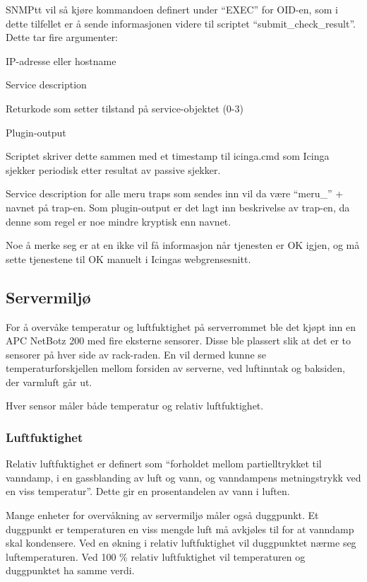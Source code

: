 SNMPtt vil så kjøre kommandoen definert under ``EXEC'' for OID-en, som i dette tilfellet er å sende informasjonen videre til scriptet ``submit\_check\_result''. Dette tar fire argumenter:

\begin{itemize*}
	\item IP-adresse eller hostname 
	\item Service description
	\item Returkode som setter tilstand på service-objektet (0-3)
	\item Plugin-output
\end{itemize*}
Scriptet skriver dette sammen med et timestamp til icinga.cmd som Icinga sjekker periodisk etter resultat av passive sjekker.

Service description for alle meru traps som sendes inn vil da være ``meru\_'' + navnet på trap-en. Som plugin-output er det lagt inn beskrivelse av trap-en, da denne som regel er noe mindre kryptisk enn navnet.

Noe å merke seg er at en ikke vil få informasjon når tjenesten er OK igjen, og må sette tjenestene til OK manuelt i Icingas webgrensesnitt.

\subsection{Servermiljø}
For å overvåke temperatur og luftfuktighet på serverrommet ble det kjøpt inn en APC NetBotz 200 med fire eksterne sensorer. Disse ble plassert slik at det er to sensorer på hver side av rack-raden. En vil dermed kunne se temperaturforskjellen mellom forsiden av serverne, ved luftinntak og baksiden, der varmluft går ut.

Hver sensor måler både temperatur og relativ luftfuktighet.

\subsubsection{Luftfuktighet}
Relativ luftfuktighet er definert som ``forholdet mellom partielltrykket til vanndamp, i en gassblanding av luft og vann, og vanndampens metningstrykk ved en viss temperatur''. Dette gir en prosentandelen av vann i luften\cite{wiki:luftfuktighet}. 

Mange enheter for overvåkning av servermiljø måler også duggpunkt. Et duggpunkt er temperaturen en viss mengde luft må avkjøles til for at vanndamp skal kondensere. Ved en økning i relativ luftfuktighet vil duggpunktet nærme seg luftemperaturen. Ved 100 \% relativ luftfuktighet vil temperaturen og duggpunktet ha samme verdi. 

